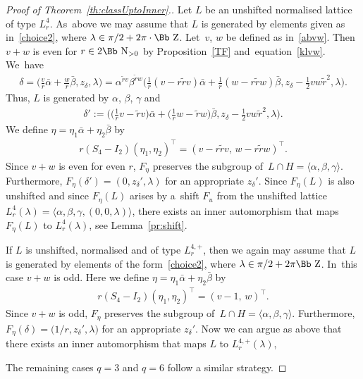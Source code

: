 \documentclass[10pt,a4paper]{amsart}
\newcommand\NN{{\mbox{\Bb N}}}
\newcommand\ZZ{{\mbox{\Bb Z}}}
\newcommand\la{\langle}
\newcommand\ra{\rangle}
\numberwithin{equation}{section}
\begin{document}
\begin{proof}[Proof of Theorem~\ref{th:classUptoInner}.]
Let $L$ be an unshifted normalised lattice of type $L^4_r$. As~above we may assume that $L$ is generated by elements given as in~\eqref{choice2}, where $\lambda\in\pi/2+2\pi\cdot\ZZ$. Let~$v$, $w$ be defined as in~\eqref{abvw}. Then $v+w$ is even for $r\in2\NN_{>0}$ by Proposition~\ref{TF} and~equation~\eqref{klvw}. We~have
\begin{gather*}
\delta= \bigg(\frac{v}{r}\bar\alpha+\frac{w}{r}\bar\beta,z_\delta,\lambda\bigg)
= \alpha^{\tilde rv}\beta^{\tilde rw}\bigg(\frac{1}{r}(v-r\tilde rv)\bar\alpha+\frac{1}{r}(w-r\tilde rw)\bar\beta,z_\delta-\frac12 vw\tilde r^2,\lambda\bigg).
\end{gather*}
Thus, $L$ is generated by $\alpha$, $\beta$, $\gamma$ and
\begin{gather*}
\delta':=\bigg(\bigg(\frac{1}{r}v-\tilde rv\bigg)\bar\alpha+\bigg(\frac{1}{r}w-\tilde rw\bigg)\bar\beta,z_\delta-\frac12 vw\tilde r^2,\lambda\bigg).
\end{gather*}
We define $\eta=\eta_1\bar \alpha +\eta_2\bar\beta$ by
\begin{gather*}
r(S_4-I_2)(\eta_1,\eta_2)^\top=(v-r\tilde rv,\,w-r\tilde rw)^\top.
\end{gather*}
Since $v+w$ is even for even $r$, $F_{\eta}$ preserves the subgroup of~$L\cap H=\la \alpha,\beta,\gamma\ra$. Furthermore, $F_{\eta}(\delta')=(0,z_\delta',\lambda)$ for an appropriate $z_\delta'$. Since $F_\eta(L)$ is also unshifted and since $F_\eta(L)$ arises by a~shift $F_u$ from the unshifted lattice $L^4_r(\lambda)=\big\langle\alpha,\beta,\gamma,(0,0,\lambda)\big\rangle$, there exists an inner automorphism that maps $F_{ \eta}(L)$ to $L^4_r(\lambda)$,
see Lemma~\ref{pr:shift}.

If $L$ is unshifted, normalised and of type $L^{4,+}_r$, then we again may assume that $L$ is generated by elements of the form~\eqref{choice2}, where $\lambda\in\pi/2+2\pi \ZZ$. In~this case $v+w$ is odd. Here we define $\eta=\eta_1\bar \alpha +\eta_2\bar\beta$ by
\begin{gather*}
r(S_4-I_2)(\eta_1,\eta_2)^\top=(v-1,\,w)^\top.
\end{gather*}
Since $v+w$ is odd, $F_{\eta}$ preserves the subgroup of~$L\cap H=\la \alpha,\beta,\gamma\ra$. Furthermore, $F_{\eta}(\delta)=\big(1/r,z_\delta',\lambda\big)$ for an appropriate $z_\delta'$. Now we can argue as above that there exists an inner automorphism that maps $L$ to $L^{4,+}_r(\lambda)$,

The remaining cases $q=3$ and $q=6$ follow a similar strategy.
\end{proof}
\end{document}
